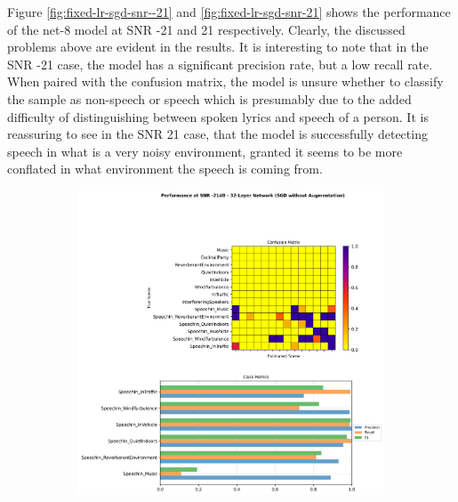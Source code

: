 \documentclass[logo,bsc,singlespacing,parskip,online]{infthesis}
\begin{document}
Figure \ref{fig:fixed-lr-sgd-snr--21} and \ref{fig:fixed-lr-sgd-snr-21} shows 
the performance of the net-8 model at SNR -21 and 21 respectively.
Clearly, the discussed problems above are evident in the results. 
It is interesting to note that in the SNR -21 case, 
the model has a significant precision rate, but a low recall rate. 
When paired with the confusion matrix, the model 
is unsure whether to classify the sample as non-speech or speech
which is presumably due to the added difficulty of distinguishing 
between spoken lyrics and speech of a person. 
It is reassuring to see in the SNR 21 case, that the model 
is successfully detecting speech in what is a very noisy environment,
granted it seems to be more conflated in what environment the speech is coming from.

\begin{figure}[h]
   \centering
   \begin{subfigure}[b]{0.48\textwidth}
      \centering
      \includegraphics[width=\textwidth]{net-32/FIXED-fixed-lr-sgd/snr_-21_performance.png}
      \caption{}
      \label{fig:fixed-lr-sgd-snr--21-net-32}
   \end{subfigure}
   \hfill
   \begin{subfigure}[b]{0.48\textwidth}  
         \centering

\end{subfigure}
\end{figure}
\end{document}
